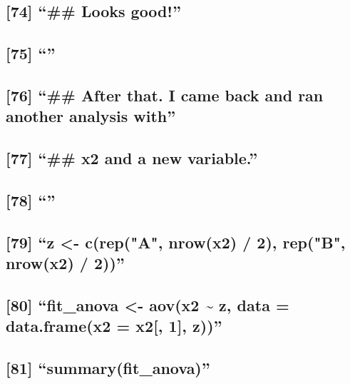 \documentclass[]{article}
\begin{document}
\subsection{\texorpdfstring{{[}74{]} ``\#\# Looks
good!''}{{[}74{]} \#\# Looks good!}}\label{looks-good}

\subsection{\texorpdfstring{{[}75{]} ``''}{{[}75{]} }}\label{section-20}

\subsection{\texorpdfstring{{[}76{]} ``\#\# After that. I came back and
ran another analysis
with''}{{[}76{]} \#\# After that. I came back and ran another analysis with}}\label{after-that.-i-came-back-and-ran-another-analysis-with}

\subsection{\texorpdfstring{{[}77{]} ``\#\# x2 and a new
variable.''}{{[}77{]} \#\# x2 and a new variable.}}\label{x2-and-a-new-variable.}

\subsection{\texorpdfstring{{[}78{]} ``''}{{[}78{]} }}\label{section-21}

\subsection{\texorpdfstring{{[}79{]} ``z \textless{}- c(rep("A",
nrow(x2) / 2), rep("B", nrow(x2) /
2))''}{{[}79{]} z \textless{}- c(rep("A", nrow(x2) / 2), rep("B", nrow(x2) / 2))}}\label{z---crepa-nrowx2-2-repb-nrowx2-2}

\subsection{\texorpdfstring{{[}80{]} ``fit\_anova \textless{}- aov(x2
\textasciitilde{} z, data = data.frame(x2 = x2{[}, 1{]},
z))''}{{[}80{]} fit\_anova \textless{}- aov(x2 \textasciitilde{} z, data = data.frame(x2 = x2{[}, 1{]}, z))}}\label{fit_anova---aovx2-z-data-data.framex2-x2-1-z}

\subsection{\texorpdfstring{{[}81{]}
``summary(fit\_anova)''}{{[}81{]} summary(fit\_anova)}}\label{summaryfit_anova}
\end{document}
